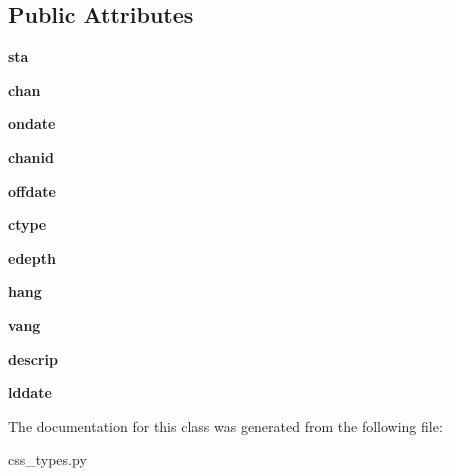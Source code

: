 \subsection*{Public Attributes}
\begin{DoxyCompactItemize}
\item 
\hypertarget{classcss__types_1_1sitechan30_aee065155f7b823dba47214c654f3105b}{}{\bfseries sta}\label{classcss__types_1_1sitechan30_aee065155f7b823dba47214c654f3105b}

\item 
\hypertarget{classcss__types_1_1sitechan30_aa5e1ed19a9eb2eb2f15ded50087dbf74}{}{\bfseries chan}\label{classcss__types_1_1sitechan30_aa5e1ed19a9eb2eb2f15ded50087dbf74}

\item 
\hypertarget{classcss__types_1_1sitechan30_aeec393dc535beebe11993209dee28192}{}{\bfseries ondate}\label{classcss__types_1_1sitechan30_aeec393dc535beebe11993209dee28192}

\item 
\hypertarget{classcss__types_1_1sitechan30_aa1fa52163a675050dc72183a404d6912}{}{\bfseries chanid}\label{classcss__types_1_1sitechan30_aa1fa52163a675050dc72183a404d6912}

\item 
\hypertarget{classcss__types_1_1sitechan30_afe7c78bca0f9749b9e2cccd6f69d46db}{}{\bfseries offdate}\label{classcss__types_1_1sitechan30_afe7c78bca0f9749b9e2cccd6f69d46db}

\item 
\hypertarget{classcss__types_1_1sitechan30_adf16d4a34d4560c95b4cbd590438c40f}{}{\bfseries ctype}\label{classcss__types_1_1sitechan30_adf16d4a34d4560c95b4cbd590438c40f}

\item 
\hypertarget{classcss__types_1_1sitechan30_a368c1dcb101c5b1c8acab668feb15b26}{}{\bfseries edepth}\label{classcss__types_1_1sitechan30_a368c1dcb101c5b1c8acab668feb15b26}

\item 
\hypertarget{classcss__types_1_1sitechan30_a130193a2d1879c4c81178614e1bc677a}{}{\bfseries hang}\label{classcss__types_1_1sitechan30_a130193a2d1879c4c81178614e1bc677a}

\item 
\hypertarget{classcss__types_1_1sitechan30_a97499502a875fed98a6cd9fd5d28c6b6}{}{\bfseries vang}\label{classcss__types_1_1sitechan30_a97499502a875fed98a6cd9fd5d28c6b6}

\item 
\hypertarget{classcss__types_1_1sitechan30_a5dcd57ceef0a1c4daf0b5283b53e5494}{}{\bfseries descrip}\label{classcss__types_1_1sitechan30_a5dcd57ceef0a1c4daf0b5283b53e5494}

\item 
\hypertarget{classcss__types_1_1sitechan30_a2e75f700e39ba08020f16cdccfa4f634}{}{\bfseries lddate}\label{classcss__types_1_1sitechan30_a2e75f700e39ba08020f16cdccfa4f634}

\end{DoxyCompactItemize}


The documentation for this class was generated from the following file\+:\begin{DoxyCompactItemize}
\item 
css\+\_\+types.\+py\end{DoxyCompactItemize}
